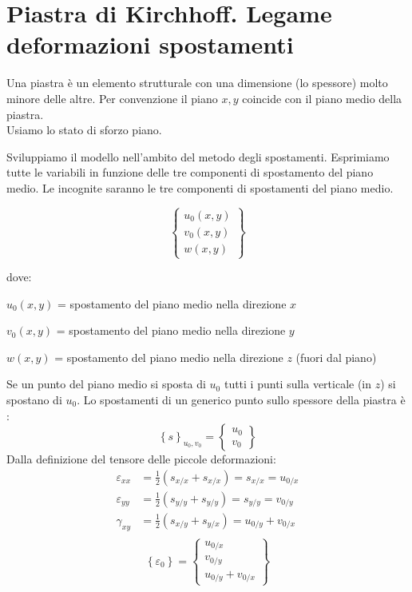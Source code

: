 \section{Piastra di Kirchhoff. Legame deformazioni spostamenti}

Una piastra è un elemento strutturale con una dimensione (lo spessore) molto minore delle altre. Per convenzione il piano $x,y$ coincide con il piano medio della piastra. \\Usiamo lo stato di sforzo piano.

Sviluppiamo il modello nell'ambito del metodo degli spostamenti. Esprimiamo tutte le variabili in funzione delle tre componenti di spostamento del piano medio. Le incognite saranno le tre componenti di spostamenti del piano medio.


\begin{equation*}
\left\{
\begin{array}{c}
u_0(x,y) \\
v_0(x,y) \\
w(x,y)
\end{array}
\right\}
\end{equation*}

dove:
\begin{compactitem}
\item $u_0(x,y)$ = spostamento del piano medio nella direzione $x$
\item $v_0(x,y)$ = spostamento del piano medio nella direzione $y$  
\item $w(x,y)$ = spostamento del piano medio nella direzione $z$ (fuori dal piano)
\end{compactitem}

Se un punto del piano medio si sposta di  $u_0$ tutti i punti sulla verticale (in $z$) si spostano di $u_0$. Lo spostamenti di un generico punto sullo spessore della piastra è :
\begin{equation*}
    \left\{s
\right\}_{u_0,v_0}=\left\{
\begin{array}{c}
u_0 \\
v_0
\end{array}
\right\}
\end{equation*}
Dalla definizione del tensore delle piccole deformazioni:
\begin{align*}
    \varepsilon_{xx}&=\frac{1}{2}(s_{x/x}+s_{x/x})=s_{x/x}=u_{0/x}\\
     \varepsilon_{yy}&=\frac{1}{2}(s_{y/y}+s_{y/y})=s_{y/y}=v_{0/y}\\
      \gamma_{xy}&=\frac{1}{2}(s_{x/y}+s_{y/x})=u_{0/y}+v_{0/x}\\
\end{align*}
\begin{equation*}
    \left\{\varepsilon_0
\right\}=\left\{
\begin{array}{c}
u_{0/x}\\
v_{0/y}\\  u_{0/y}+v_{0/x}
\end{array}
\right\}
\end{equation*}

